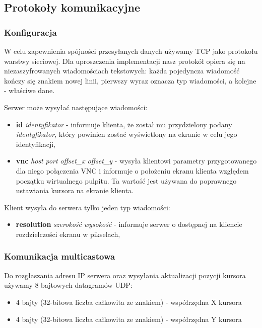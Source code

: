   \subsection{Protokoły komunikacyjne}

    \subsubsection{Konfiguracja}

      W celu zapewnienia spójności przesyłanych danych używamy TCP jako protokołu warstwy sieciowej. Dla uproszczenia implementacji nasz protokół opiera się na niezaszyfrowanych wiadomościach tekstowych: każda pojedyncza wiadomość kończy się znakiem nowej linii, pierwszy wyraz oznacza typ wiadomości, a kolejne - właściwe dane.

      Serwer może wysyłać następujące wiadomości:
      \begin{itemize}[nolistsep]
        \item \textbf{id} \emph{identyfikator} - informuje klienta, że został mu przydzielony podany \emph{identyfikator}, który powinien zostać wyświetlony na ekranie w celu jego identyfikacji,
        \item \textbf{vnc} \emph{host} \emph{port} \emph{offset\_x} \emph{offset\_y} - wysyła klientowi parametry przygotowanego dla niego połączenia VNC i informuje o położeniu ekranu klienta względem początku wirtualnego pulpitu. Ta wartość jest używana do poprawnego ustawiania kursora na ekranie klienta.
      \end{itemize}

      Klient wysyła do serwera tylko jeden typ wiadomości:
      \begin{itemize}[nolistsep]
        \item \textbf{resolution} \emph{szerokość} \emph{wysokość} - informuje serwer o dostępnej na kliencie rozdzielczości ekranu w pikselach,
      \end{itemize}

    \subsubsection{Komunikacja multicastowa}

      Do rozgłaszania adresu IP serwera oraz wysyłania aktualizacji pozycji kursora używamy 8-bajtowych datagramów UDP:
      \begin{itemize}[nolistsep]
        \item 4 bajty (32-bitowa liczba całkowita ze znakiem) - współrzędna X kursora
        \item 4 bajty (32-bitowa liczba całkowita ze znakiem) - współrzędna Y kursora
      \end{itemize}

